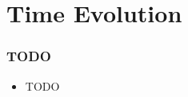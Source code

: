 \section{Time Evolution}
    \begin{frame}[t]
        \frametitle{TODO}
        
        \vspace{-0.5em}
        \begin{itemize}
            \item TODO
        \end{itemize}

        \onslide %
    \end{frame}
